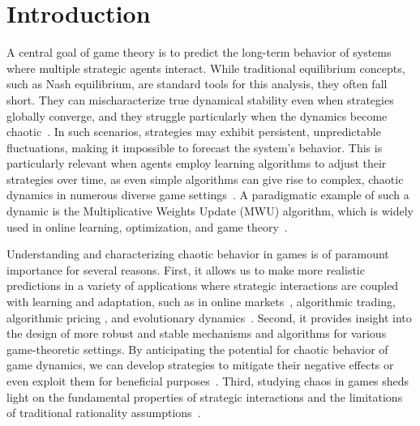 \documentclass[format=acmsmall, authorversion, screen=true]{acmart}
\begin{document}


\section{Introduction}


A central goal of game theory is to predict the long-term behavior of systems where multiple strategic agents interact. While traditional equilibrium concepts, such as Nash equilibrium, are standard tools for this analysis, they often fall short. They can mischaracterize true dynamical stability even when strategies globally converge, and they struggle particularly when the dynamics become chaotic~\cite{piliouras2026paradoxes}. In such scenarios, strategies may exhibit persistent, unpredictable fluctuations, making it impossible to forecast the system's behavior. This is particularly relevant when agents employ learning algorithms to adjust their strategies over time, as even simple algorithms can give rise to complex, chaotic dynamics in numerous diverse game settings~\cite{p2023no,palaiopanos2017multiplicative,Sato02042002,CFMP2019,andrade2021learning,skyrms1992chaos,mukhopadhyay2020deciphering,GallaFarmer_ScientificReport18,falniowski2025discrete,mitchener2004chaos,nowak1992evolutionary,peixe2022persistent,anagnostides2026chaos,metaxas2026risk}. A paradigmatic example of such a dynamic is the Multiplicative Weights Update (MWU) algorithm, which is widely used in online learning, optimization, and game theory~\cite{Arora05themultiplicative,Nisan:2007:AGT:1296179}.

Understanding and characterizing chaotic behavior in games is of paramount importance for several reasons. First, it allows us to make more realistic predictions in a variety of applications where strategic interactions are coupled with learning and adaptation, such as in online markets~\cite{leonardos2021dynamical}, algorithmic trading, algorithmic pricing \cite{calvano2020artificial,klein2021autonomous}, and evolutionary dynamics~\cite{Sato02042002,Sandholm10}. Second, it provides insight into the design of more robust and stable mechanisms and algorithms for various game-theoretic settings. By anticipating the potential for chaotic behavior of game dynamics, we can develop strategies to mitigate their negative effects or even exploit them for beneficial purposes~\cite{nagarajan2020chaos,leonardos2023optimality,piliouras2023multi}. Third, studying chaos in games sheds light on the fundamental properties of strategic interactions and the limitations of traditional rationality assumptions~\cite{arthur1994inductive,farmer2009economy,levy1994chaos}.
\end{document}
